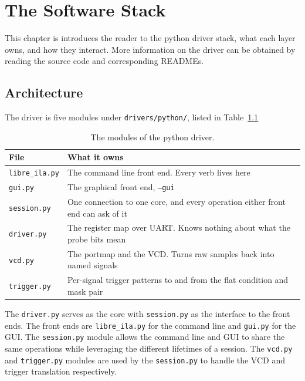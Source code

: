 \documentclass[../manual.tex]{subfiles}
\begin{document}
\chapter{The Software Stack}
\label{ch:stack}

This chapter is introduces the reader to the python driver stack, what each layer owns, and how they interact. More information on the driver can be obtained by reading the source code and corresponding READMEs.

\section{Architecture}
\label{sec:stack_arch}

The driver is five modules under \texttt{drivers/python/}, listed in Table~\ref{tab:stack_files}

\begin{table}[H]
    \centering
    \begin{tabularx}{\textwidth}{|l|X|}
        \hline
        \rowcolor{gray!40} \textbf{File} & \textbf{What it owns} \\
        \hline
        \texttt{libre\_ila.py} & The command line front end. Every verb lives here \\
        \hline
        \texttt{gui.py} & The graphical front end, \texttt{--gui} \\
        \hline
        \texttt{session.py} & One connection to one core, and every operation either front end can ask of it \\
        \hline
        \texttt{driver.py} & The register map over UART. Knows nothing about what the probe bits mean \\
        \hline
        \texttt{vcd.py} & The portmap and the VCD. Turns raw samples back into named signals \\
        \hline
        \texttt{trigger.py} & Per-signal trigger patterns to and from the flat condition and mask pair \\
        \hline
    \end{tabularx}
    \caption{The modules of the python driver.}
    \label{tab:stack_files}
\end{table}

The \texttt{driver.py} serves as the core with \texttt{session.py} as the interface to the front ends. The front ends are \texttt{libre\_ila.py} for the command line and \texttt{gui.py} for the GUI. The \texttt{session.py} module allows the command line and GUI to share the same operations while leveraging the different lifetimes of a session. The \texttt{vcd.py} and \texttt{trigger.py} modules are used by the \texttt{session.py} to handle the VCD and trigger translation respectively.
\end{document}
